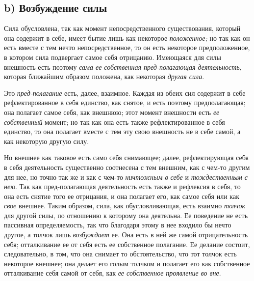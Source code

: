 \subsection[b) Возбуждение силы]{b) Возбуждение силы}

Сила обусловлена, так как момент непосредственного существования, который она
содержит в себе, имеет бытие лишь как некоторое {\em положенное;} но так как он
есть вместе с тем нечто непосредственное, то он есть некоторое предположенное,
в котором сила подвергает самое себя отрицанию. Имеющаяся для силы внешность
есть поэтому {\em сама ее собственная пред-полагающая деятельность},
которая ближайшим образом положена, как некоторая {\em другая сила}.

Это {\em пред-полагание} есть, далее, взаимное. Каждая
из обеих сил содержит в себе рефлектированное в себя единство, как снятое,
и есть поэтому предполагающая; она полагает самое себя, как внешнюю; этот
момент внешности есть {\em ее собственный} момент; но
так как она есть также рефлектированное в себя единство, то она полагает
вместе с тем эту свою внешность не в себе самой, а как некоторую другую силу.

Но внешнее как таковое есть само себя снимающее; далее, рефлектирующая себя
в себя деятельность существенно соотнесена с тем внешним, как с чем-то
другим для нее, но точно так же и как с чем-то {\em ничтожным в себе} и
{\em тождественным с нею}. Так как пред-полагающая
деятельность есть также и рефлексия в себя, то она есть снятие того ее
отрицания, и она полагает его, как самое себя или как
{\em свое} внешнее. Таким образом, сила, как
обусловливающая, есть взаимно {\em толчок} для другой
силы, по отношению к которому она деятельна. Ее поведение не есть пассивная
определяемость, так что благодаря этому в нее входило бы нечто другое, а
толчок лишь {\em возбуждает} ее. Она есть в ней же
самой отрицательность себя; отталкивание ее от себя есть ее собственное
полагание. Ее делание состоит, следовательно, в том, что она снимает то
обстоятельство, что тот толчок есть некоторое внешнее; она делает его голым
толчком и полагает его как собственное отталкивание себя самой от себя, как
{\em ее собственное проявление во вне}.

